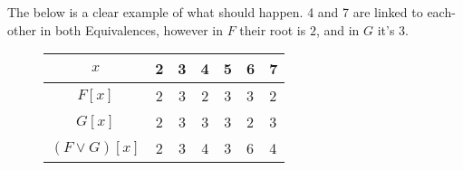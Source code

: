 \documentclass[11pt,table]{article}
\newcounter{r}
\begin{document}
The below is a clear example of what should happen. 4 and 7 are linked to each-other in both Equivalences, however in $ F $ their root is $ 2 $, and in $ G $ it's 3. 

\begin{figure}[h]
	\centering
	\begin{tabular}{|c|c|c|c|c|l|l|}
		\hline
		$x$              & 2                           		& 3                                 & 4                         & 5                         & 6                         & 7                         \\ \hline
		$F[x]$          & \cellcolor{red!25}2	  & \cellcolor{yellow!25}3   & \cellcolor{green!25}2 & \cellcolor{yellow!25}3 & \cellcolor{blue!25}3 & \cellcolor{green!25}2 \\ \hline
		$G[x]$         & \cellcolor{red!25}2      & \cellcolor{yellow!25}3  & \cellcolor{green!25}3 & \cellcolor{yellow!25}3 & \cellcolor{blue!25}2 & \cellcolor{green!25}3 \\ \hline
		$(F\vee G)[x]$ & \cellcolor{red!25}2  & \cellcolor{yellow!25}3   & \cellcolor{green!25}4 & \cellcolor{yellow!25}3 & \cellcolor{blue!25}6 & \cellcolor{green!25}4 \\ \hline
	\end{tabular}
	\vspace{.2in}


\end{figure}
\end{document}
